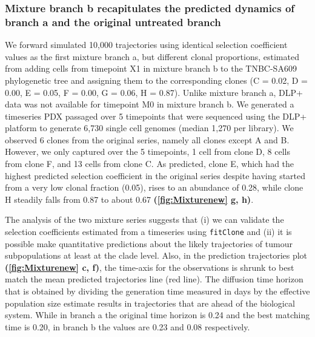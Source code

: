 \subsubsection{Mixture branch b recapitulates the predicted dynamics of branch a and the original untreated branch}
We forward simulated 10,000 trajectories using identical selection coefficient values as the first mixture branch a, but different clonal proportions, estimated from adding cells from timepoint X1 in mixture branch b to the TNBC-SA609 phylogenetic tree and assigning them to the corresponding clones (C = 0.02, D = 0.00, E = 0.05, F = 0.00, G = 0.06, H = 0.87). Unlike mixture branch a, DLP+ data was not available for timepoint M0 in mixture branch b. We generated a timeseries PDX passaged over 5 timepoints that were sequenced using the DLP+ platform to generate 6,730 single cell genomes (median 1,270 per library). We observed 6 clones from the original series, namely all clones except A and B. However, we only captured over the 5 timepoints, 1 cell from clone D, 8 cells from clone F, and 13 cells from clone C. As predicted, clone E, which had the highest predicted selection coefficient in the original series despite having started from a very low clonal fraction (0.05), rises to an abundance of 0.28, while clone H steadily falls from 0.87 to about 0.67 \textbf{(\autoref{fig:Mixturenew} g, h)}.

The analysis of the two mixture series suggests that (i) we can validate the selection coefficients estimated from a timeseries using \texttt{fitClone} and (ii) it is possible make quantitative predictions about the likely trajectories of tumour subpopulations at least at the clade level. Also, in the prediction trajectories plot \textbf{(\autoref{fig:Mixturenew} c, f)}, the time-axis for the observations is shrunk to best match the mean predicted trajectories line (red line). The diffusion time horizon that is obtained by dividing the generation time measured in days by the effective population size estimate results in trajectories that are ahead of the biological system. While in branch a the original time horizon is 0.24 and the best matching time is 0.20, in branch b the values are 0.23 and 0.08 respectively.

